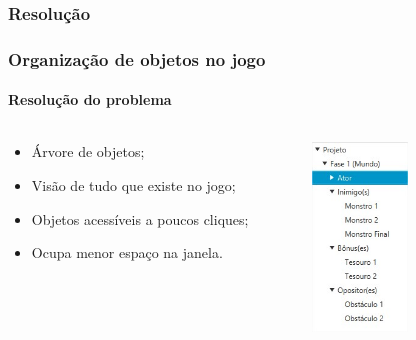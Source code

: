 \documentclass{beamer}
\begin{document}
   \subsubsection{Resolução}
   \begin{frame}
      \frametitle{Organização de objetos no jogo}
      \framesubtitle{Resolução do problema}

      \begin{columns}[T]
         \begin{column}{0.48\textwidth}
            \begin{itemize}
               \item Árvore de objetos;
               \item Visão de tudo que existe no jogo;
               \item Objetos acessíveis a poucos cliques;
               \item Ocupa menor espaço na janela.
            \end{itemize}
         \end{column}
         \begin{column}{0.48\textwidth}
            \begin{center}
            \includegraphics[width=0.48\textwidth]{images/arvore_objetos.jpg}
            \end{center}
         \end{column}
      \end{columns}
   \end{frame}
\end{document}
